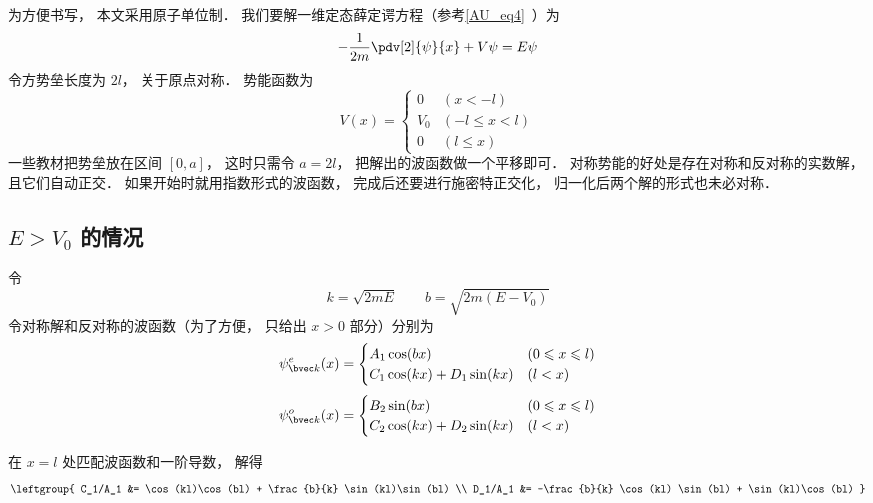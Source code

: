 
\begin{issues}
\issueDraft
\end{issues}



为方便书写， 本文采用原子单位制． 我们要解一维定态薛定谔方程（参考\autoref{AU_eq4}~）为
\begin{equation}
-\frac{1}{2m} \pdv[2]{\psi}{x} + V\psi= E \psi
\end{equation}
令方势垒长度为 $2l$， 关于原点对称． 势能函数为
\begin{equation}
V(x) =
\begin{cases}
0 & (x < -l)\\
V_0 & (-l \leqslant x < l)\\
0 & (l \leqslant x)
\end{cases}
\end{equation}
一些教材把势垒放在区间 $[0, a]$， 这时只需令 $a = 2l$， 把解出的波函数做一个平移即可． 对称势能的好处是存在对称和反对称的实数解， 且它们自动正交． 如果开始时就用指数形式的波函数， 完成后还要进行施密特正交化， 归一化后两个解的形式也未必对称．

\subsection{$E > V_0$ 的情况}
令
\begin{equation}
k = \sqrt{2mE}
\qquad
b = \sqrt{2m(E-V_0)}
\end{equation}
令对称解和反对称的波函数（为了方便， 只给出 $x > 0$ 部分）分别为
\begin{equation}
\psi_{\bvec k}^e(x) =
\begin{cases}
A_1 \cos(bx) & (0 \leqslant x \leqslant l)\\
C_1 \cos(kx) + D_1 \sin(kx) & (l < x)
\end{cases}
\end{equation}
\begin{equation}
\psi_{\bvec k}^o(x) =
\begin{cases}
B_2 \sin(bx) & (0 \leqslant x \leqslant l)\\
C_2 \cos(kx) + D_2 \sin(kx) & (l < x)
\end{cases}
\end{equation}

在 $x = l$ 处匹配波函数和一阶导数， 解得
\begin{equation}
\leftgroup{
C_1/A_1 &= \cos(kl)\cos(bl) + \frac{b}{k} \sin(kl)\sin(bl) \\
D_1/A_1 &= -\frac{b}{k} \cos(kl) \sin(bl) + \sin(kl)\cos(bl)
}
\end{equation}

